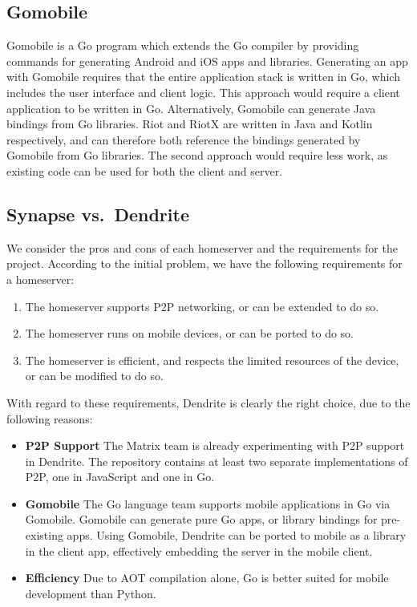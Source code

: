 \subsection{Gomobile}
Gomobile is a Go program which extends the Go compiler by providing commands for generating Android and iOS apps and libraries\cite{gomobile}.
Generating an app with Gomobile requires that the entire application stack is written in Go, which includes the user interface and client logic.
This approach would require a client application to be written in Go.
Alternatively, Gomobile can generate Java bindings from Go libraries.
Riot and RiotX are written in Java and Kotlin respectively, and can therefore both reference the bindings generated by Gomobile from Go libraries.
The second approach would require less work, as existing code can be used for both the client and server.

\subsection{Synapse vs.~Dendrite}
We consider the pros and cons of each homeserver and the requirements for the project.
According to the initial problem, we have the following requirements for a homeserver:
\begin{enumerate}
      \item{
            The homeserver supports \ac{P2P} networking, or can be extended to do so.
            }
      \item{
            The homeserver runs on mobile devices, or can be ported to do so.
            }
      \item{
            The homeserver is efficient, and respects the limited resources of the device, or can be modified to do so.
            }
\end{enumerate}
With regard to these requirements, Dendrite is clearly the right choice, due to the following reasons:
\begin{itemize}
      \item{
            \textbf{\ac{P2P} Support}
            The Matrix team is already experimenting with \ac{P2P} support in Dendrite.
            The repository contains at least two separate implementations of \ac{P2P}, one in JavaScript and one in Go\cite{fosdem_event_p2p_matrix}.
            }
      \item{
            \textbf{Gomobile}
            The Go language team supports mobile applications in Go via Gomobile\cite{gomobile}.
            Gomobile can generate pure Go apps, or library bindings for pre-existing apps.
            Using Gomobile, Dendrite can be ported to mobile as a library in the client app, effectively embedding the server in the mobile client.
            }
      \item{
            \textbf{Efficiency}
            Due to \ac{AOT} compilation alone, Go is better suited for mobile development than Python.
            }
\end{itemize}

